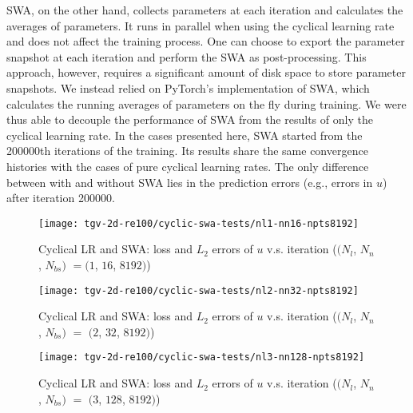 SWA, on the other hand, collects parameters at each iteration and calculates the averages of parameters.
It runs in parallel when using the cyclical learning rate and does not affect the training process.
One can choose to export the parameter snapshot at each iteration and perform the SWA as post-processing.
This approach, however, requires a significant amount of disk space to store parameter snapshots.
We instead relied on PyTorch's implementation of SWA, which calculates the running averages of parameters on the fly during training.
We were thus able to decouple the performance of SWA from the results of only the cyclical learning rate.
In the cases presented here, SWA started from the \num{200000}th iterations of the training.
Its results share the same convergence histories with the cases of pure cyclical learning rates.
The only difference between with and without SWA lies in the prediction errors (e.g., errors in $u$) after iteration \num{200000}.

\begin{figure}[hbt!]
    \centering%
    \texttt{[image: tgv-2d-re100/cyclic-swa-tests/nl1-nn16-npts8192]}%
    \caption[%
        Cyclical LR and SWA: loss and $L_2$ errors of $u$ v.s. iteration ($(N_l$, $N_n$, $N_{bs})$ $=$ $(1$, $16$, $8192)$)%
    ]{%
        Cyclical LR and SWA: loss and $L_2$ errors of $u$ v.s. iteration ($(N_l$, $N_n$, $N_{bs})$ $=(1$, $16$, $8192)$)%
    }\label{fig:cyclic-swa-tests-nl1-nn16-npts8192}%
\end{figure}

\begin{figure}[hbt!]
    \centering%
    \texttt{[image: tgv-2d-re100/cyclic-swa-tests/nl2-nn32-npts8192]}%
    \caption[%
        Cyclical LR and SWA: loss and $L_2$ errors of $u$ v.s. iteration ($(N_l$, $N_n$, $N_{bs})$ $=$ $(2$, $32$, $8192)$)%
    ]{%
        Cyclical LR and SWA: loss and $L_2$ errors of $u$ v.s. iteration ($(N_l$, $N_n$, $N_{bs})$ $=$ $(2$, $32$, $8192)$)%
    }\label{fig:cyclic-swa-tests-nl2-nn32-npts8192}%
\end{figure}

\begin{figure}[hbt!]
    \centering%
    \texttt{[image: tgv-2d-re100/cyclic-swa-tests/nl3-nn128-npts8192]}%
    \caption[%
        Cyclical LR and SWA: loss and $L_2$ errors of $u$ v.s. iteration ($(N_l$, $N_n$, $N_{bs})$ $=$ $(3$, $128$, $8192)$)%
    ]{%
        Cyclical LR and SWA: loss and $L_2$ errors of $u$ v.s. iteration ($(N_l$, $N_n$, $N_{bs})$ $=$ $(3$, $128$, $8192)$)%
    }\label{fig:cyclic-swa-tests-nl3-nn128-npts8192}%
\end{figure}


